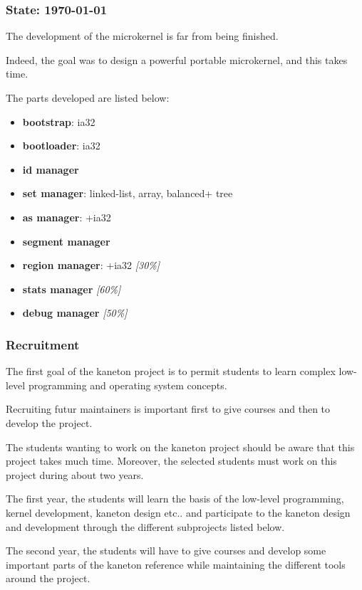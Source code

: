\documentclass[8pt]{beamer}
\newcommand{\nl}[0]{\vspace{0.4cm}}
\begin{document}
\begin{frame}
  \frametitle{State: \textbf{\today}}

  The development of the microkernel is far from being finished.

  \nl

  Indeed, the goal was to design a powerful portable microkernel, and this
  takes time.

  \nl

  The parts developed are listed below:

  \begin{itemize}[<+->]
    \item
      \textbf{bootstrap}: ia32
    \item
      \textbf{bootloader}: ia32
    \item
      \textbf{id manager}
    \item
      \textbf{set manager}: linked-list, array, balanced+ tree
    \item
      \textbf{as manager}: +ia32
    \item
      \textbf{segment manager}
    \item
      \textbf{region manager}: +ia32 \textit{[30\%]}
    \item
      \textbf{stats manager} \textit{[60\%]}
    \item
      \textbf{debug manager} \textit{[50\%]}
  \end{itemize}
\end{frame}


\begin{frame}
  \frametitle{Recruitment}

  The first goal of the kaneton project is to permit students to
  learn complex low-level programming and operating system concepts.

  \nl

  Recruiting futur maintainers is important first to give courses
  and then to develop the project.

  \nl

  The students wanting to work on the kaneton project should be aware
  that this project takes much time. Moreover, the selected students
  must work on this project during about two years.

  \nl

  The first year, the students will learn the basis of the low-level
  programming, kernel development, kaneton design etc.. and participate
  to the kaneton design and development through the different subprojects
  listed below.

  \nl

  The second year, the students will have to give courses and develop
  some important parts of the kaneton reference while maintaining the
  different tools around the project.
\end{frame}
\end{document}
